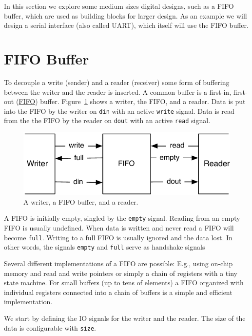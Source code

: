 \documentclass[%
    10pt, %
    headinclude, footexclude,
    openright, %
    notitlepage,
    cleardoubleempty,
    headsepline,
    pointlessnumbers,
    bibtotoc, idxtotoc,
    ]{scrbook}
\newcommand{\code}[1]{{\small{\texttt{#1}}}}
\begin{document}
In this section we explore some medium sizes digital designs, such as
a FIFO buffer, which are used as building blocks for larger design.
As an example we will design a serial interface (also called UART),
which itself will use the FIFO buffer.

\section{FIFO Buffer}

To decouple a write (sender) and a reader (receiver) some form
of buffering between the writer and the reader is inserted.
A common buffer is a first-in, first-out
(\href{https://en.wikipedia.org/wiki/FIFO_%28computing_and_electronics%29}{FIFO})
buffer. Figure~\ref{fig:fifo} shows a writer, the FIFO, and a reader.
Data is put into the FIFO by the writer on \code{din} with an active
\code{write} signal. Data is read from the the FIFO by the reader on
\code{dout} with an active \code{read} signal.

\begin{figure}
  \centering
  \includegraphics{figures/fifo}

  \caption{A writer, a FIFO buffer, and a reader.}
  \label{fig:fifo}
\end{figure}

A FIFO is initially empty, singled by the \code{empty} signal. Reading
from an empty FIFO is usually undefined. When data is written and never
read a FIFO will become \code{full}. Writing to a full FIFO is usually ignored
and the data lost. In other words, the signals \code{empty} and \code{full}
serve as handshake signals 

Several different implementations of a FIFO are possible: E.g., using on-chip
memory and read and write pointers or simply a chain of registers with a
tiny state machine. For small buffers (up to tens of elements) a FIFO organized
with individual registers connected into a chain of buffers is a simple and efficient
implementation.

We start by defining the IO signals for the writer and the reader. The size of
the data is configurable with \code{size}.
\end{document}
